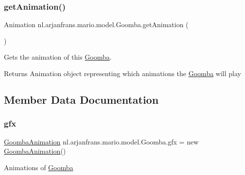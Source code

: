 \subsubsection{\texorpdfstring{get\+Animation()}{getAnimation()}}
{\footnotesize\ttfamily Animation nl.\+arjanfrans.\+mario.\+model.\+Goomba.\+get\+Animation (\begin{DoxyParamCaption}{ }\end{DoxyParamCaption})}



Gets the animation of this \hyperlink{classnl_1_1arjanfrans_1_1mario_1_1model_1_1Goomba}{Goomba}. 

\begin{DoxyReturn}{Returns}
Animation object representing which animations the \hyperlink{classnl_1_1arjanfrans_1_1mario_1_1model_1_1Goomba}{Goomba} will play 
\end{DoxyReturn}


\subsection{Member Data Documentation}
\mbox{\label{classnl_1_1arjanfrans_1_1mario_1_1model_1_1Goomba_a936ff77c12f392ca3bf555f49b850e9e}} 
\subsubsection{\texorpdfstring{gfx}{gfx}}
{\footnotesize\ttfamily \hyperlink{classnl_1_1arjanfrans_1_1mario_1_1graphics_1_1GoombaAnimation}{Goomba\+Animation} nl.\+arjanfrans.\+mario.\+model.\+Goomba.\+gfx = new \hyperlink{classnl_1_1arjanfrans_1_1mario_1_1graphics_1_1GoombaAnimation}{Goomba\+Animation}()\hspace{0.3cm}{\ttfamily [protected]}}

Animations of \hyperlink{classnl_1_1arjanfrans_1_1mario_1_1model_1_1Goomba}{Goomba} \mbox{\label{classnl_1_1arjanfrans_1_1mario_1_1model_1_1Goomba_a8cc5010ce400234e91ec1c13be0d8421}} 
